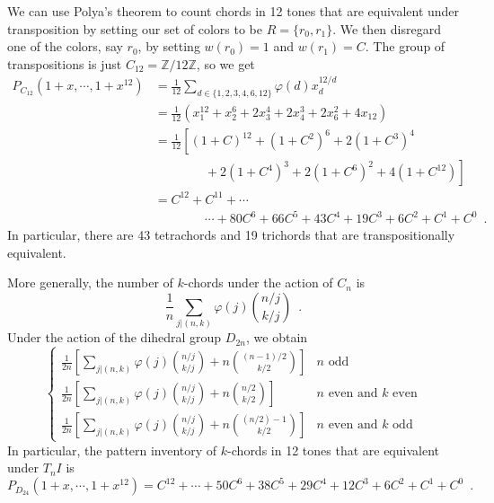 \begin{example}
	We can use Polya's theorem to count chords in 12 tones that are equivalent under
	transposition by setting our set of colors to be $R = \{ r_0, r_1 \}$. We then disregard
	one of the colors, say $r_0$, by setting $w(r_0) = 1$ and $w(r_1) = C$. The group of
	transpositions is just $C_{12} = \mathbb{Z} / 12 \mathbb{Z}$, so we get
		\begin{align}
			P_{C_{12}}(1 + x, \cdots, 1 + x^{12})
			& = \frac{1}{12} \sum_{d \in \{ 1, 2, 3, 4, 6, 12 \}} \varphi(d) x_d^{12 / d} \\
			& = \frac{1}{12} \left( x_1^{12} + x_2^{6} + 2 x_3^{4} + 2 x_4^{3} +
			2 x_6^{2} + 4 x_{12} \right) \\
			& = \frac{1}{12} \left[ (1 + C)^{12} + (1 + C^2)^{6} + 2 (1 + C^3)^{4} \right. \\
			& \qquad \qquad
			+ \left. 2 (1 + C^4)^{3} + 2 (1 + C^6)^{2} + 4 (1 + C^{12}) \right] \\
			& = C^{12} + C^{11} + \cdots \\
			& \qquad \qquad
			\cdots + 80 C^6 + 66 C^5 + 43 C^4 + 19 C^3 + 6 C^2 + C^1 + C^0 \enspace.
		\end{align}
	In particular, there are 43 tetrachords and 19 trichords that are transpositionally
	equivalent.
\end{example}

\begin{example}
	\cite[53]{Reiner1985}
	More generally, the number of $k$-chords under the action of $C_n$ is
	\begin{equation}
		\frac{1}{n} \sum_{j | (n, k)} \varphi(j) {{n / j}\choose{k / j}} \enspace.
	\end{equation}
	Under the action of the dihedral group $D_{2n}$, we obtain
	\begin{equation}
		\begin{cases}
 			\frac{1}{2n} \left[ \sum_{j | (n, k)} \varphi(j) {{n / j}\choose{k / j}} +
 			n {{(n - 1) / 2} \choose{k / 2}} \right] & n \text{ odd} \\
 			\frac{1}{2n} \left[ \sum_{j | (n, k)} \varphi(j) {{n / j}\choose{k / j}} +
 			n {{n / 2} \choose{k / 2}} \right] & n \text{ even and } k \text{ even} \\
 			\frac{1}{2n} \left[ \sum_{j | (n, k)} \varphi(j) {{n / j}\choose{k / j}} +
 			n {{(n / 2) - 1} \choose{k / 2}} \right] & n \text{ even and } k \text{ odd}
 		\end{cases}
	\end{equation}
	In particular, the pattern inventory of $k$-chords in 12 tones that are equivalent under
	$T_nI$ is
	\begin{equation}
		P_{D_{24}}(1 + x, \cdots, 1 + x^{12}) = C^{12} + \cdots + 50 C^6 +
		38 C^5 + 29 C^4 + 12 C^3 + 6 C^2 + C^1 + C^0 \enspace.
	\end{equation}
\end{example}

